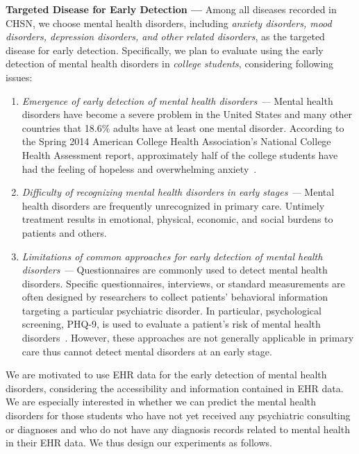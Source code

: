 \textbf{Targeted Disease for Early Detection --- } Among all diseases recorded in CHSN, we choose mental health disorders, including \emph{anxiety disorders, mood disorders, depression disorders, and other related disorders}, as the targeted disease for early detection. 
Specifically, we plan to evaluate \TheName{} using the early detection of mental health disorders in \emph{college students}, considering following issues:
\begin{enumerate}
\item  \emph{Emergence of early detection of mental health disorders --- } Mental health disorders have become a severe problem in the United States and many other countries that 18.6\% adults have at least one mental disorder. 
According to the Spring 2014 American College Health Association's National College Health Assessment report, approximately half of the college students have had the feeling of hopeless and overwhelming anxiety~\cite{ACHA2014}. 

\item  \emph{Difficulty of recognizing mental health disorders in early stages --- } Mental health disorders are frequently unrecognized  in primary care. 
Untimely treatment results in emotional, physical, economic, and social burdens to patients and others. 

\item \emph{Limitations of common approaches for early detection of mental health disorders --- } Questionnaires are commonly used to detect mental health disorders. 
    Specific questionnaires, interviews, or standard measurements are often designed by researchers to collect patients' behavioral information targeting a particular psychiatric disorder. 
    In particular, psychological screening, PHQ-9, is used to evaluate a patient's risk of mental health disorders~\cite{kroenke2002phq}. 
    However, these approaches are not generally applicable in primary care thus cannot detect mental disorders at an early stage. 

\end{enumerate}
%
We are motivated to use EHR data for the early detection of mental health disorders, considering the accessibility and information contained in EHR data. 
We are especially interested in whether we can predict the mental health disorders for those students who have not yet received any psychiatric consulting or diagnoses and who do not have any diagnosis records related to mental health in their EHR data. 
We thus design our experiments as follows.

